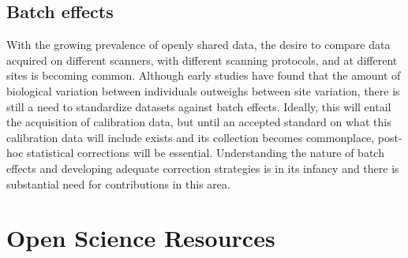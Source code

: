 \subsection{Batch effects}

With the growing prevalence of openly shared data, the desire to compare data acquired on different scanners, with different scanning protocols, and at different sites is becoming common. Although early studies have found that the amount of biological variation between individuals outweighs between site variation\cite{biswal}, there is still a need to standardize datasets against batch effects\cite{YanStand}. Ideally, this will entail the acquisition of calibration data, but until an accepted standard on what this calibration data will include exists and its collection becomes commonplace, post-hoc statistical corrections will be essential. Understanding the nature of batch effects and developing adequate correction strategies is in its infancy and there is substantial need for contributions in this area.  

\section{Open Science Resources}

